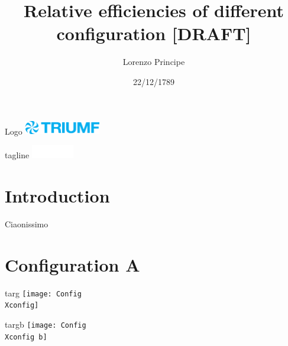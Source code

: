 \documentclass[a4paper,twoside]{report}
\newcounter{N}
\newcounter{I}
\begin{document}
\begin{dynamiccontents*}{Logo}
\hspace{10 pt}
\includegraphics[width=0.25\textwidth]{Tlogo}
\end{dynamiccontents*}

\begin{dynamiccontents*}{tagline}
\centering
\vspace{0.95\textwidth}
\includegraphics[width=0.14\textwidth]{Tagline}
\end{dynamiccontents*}


\title{Relative efficiencies of different configuration [DRAFT]}
\author{Lorenzo Principe}
\date{22/12/1789}


\maketitle


\chapter*{Introduction}

\lipsum[1-8]

Ciaonissimo




\newcommand{\Xconfig}{A}
\chapter*{Configuration \Xconfig}

\begin{dynamiccontents*}{targ}
\texttt{[image: Config\\Xconfig]}
\end{dynamiccontents*}
\begin{dynamiccontents*}{targb}
\texttt{[image: Config\\Xconfig b]}
\end{dynamiccontents*}
\end{document}
